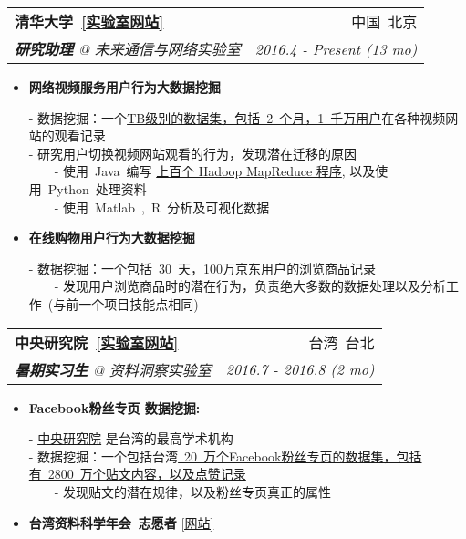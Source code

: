\documentclass[letterpaper,11pt]{article}
\makeatletter
\newcommand{\resumeItem}[2]{
  \item\small{
    \textbf{#1}{ #2 \vspace{-2pt}}
  }
}
\newcommand{\resumeSubheading}[4]{
  \vspace{-1pt}\item
    \begin{tabular*}{0.97\textwidth}{l@{\extracolsep{\fill}}r}
      \textbf{#1} & #2 \\
      \textit{\small#3} & \textit{\small #4} \\
    \end{tabular*}\vspace{-5pt}
}
\newcommand{\resumeItemListStart}{\begin{itemize}}
\newcommand{\resumeItemListEnd}{\end{itemize}\vspace{-5pt}}
\makeatother
\begin{document}
\begin{CJK*}{UTF8}{gbsn}
    \resumeSubheading
      {清华大学~\color{blue}\href{http://fi.ee.tsinghua.edu.cn}{[实验室网站]}}{中国~北京}
      {\textbf{研究助理} @ 未来通信与网络实验室}{2016.4 - Present (13 mo)}
      \resumeItemListStart

        \resumeItem{网络视频服务用户行为大数据挖掘}\\
        \vspace{1mm}
          {- 数据挖掘：一个\underline{TB级别的数据集，包括~2~个月，1~千万用户}在各种视频网站的观看记录}\\
          {- 研究用户切换视频网站观看的行为，发现潜在迁移的原因}\\
          {~~~~- 使用~Java~编写 \underline{上百个 Hadoop MapReduce 程序}, 以及使用~Python~处理资料}\\
          {~~~~- 使用~Matlab~,~R~分析及可视化数据}\\

        \resumeItem{在线购物用户行为大数据挖掘}\\
        \vspace{1mm}
          {- 数据挖掘：一个包括\underline{~30~天，100万京东用户}的浏览商品记录}\\
          {~~~~- 发现用户浏览商品时的潜在行为，负责绝大多数的数据处理以及分析工作~(与前一个项目技能点相同)}\\
      \resumeItemListEnd
  
    \resumeSubheading
      {中央研究院~\color{blue}\href{http://mmnet.iis.sinica.edu.tw}{[实验室网站]}}{台湾~台北}
      {\textbf{暑期实习生} @ 资料洞察实验室}{2016.7 - 2016.8 (2 mo)}
      \resumeItemListStart
        \resumeItem{Facebook粉丝专页 数据挖掘: }\\
        \vspace{1mm}
          {- \href{https://www.sinica.edu.tw/ch}{中央研究院} 是台湾的最高学术机构}\\
          {- 数据挖掘：一个包括台湾\underline{~20~万个Facebook粉丝专页的数据集，包括有~2800~万个贴文内容，以及点赞记录}}\\
          {~~~~- 发现贴文的潜在规律，以及粉丝专页真正的属性}\\
        \resumeItem{台湾资料科学年会~志愿者} {\color{blue}\href{http://www.datasci.tw}{[网站]}} \\
      \resumeItemListEnd


\end{CJK*}
\end{document}
